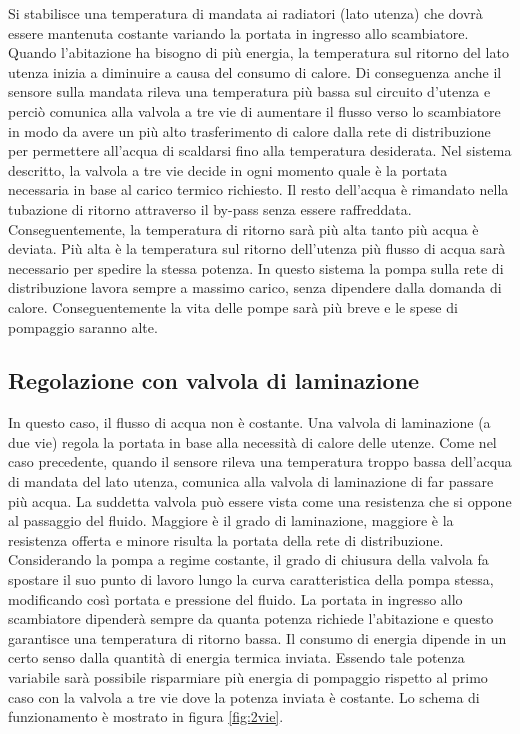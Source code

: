 \documentclass[laurea,oneside,11pt]{USiena_tesiLM}
\begin{document}
Si stabilisce una temperatura di mandata ai radiatori (lato utenza) che dovrà essere mantenuta costante variando la portata in ingresso allo scambiatore. Quando l'abitazione ha bisogno di più energia, la temperatura sul ritorno del lato utenza inizia a diminuire a causa del consumo di calore. Di conseguenza anche il sensore sulla mandata rileva una temperatura più bassa sul circuito d'utenza  e perciò comunica alla valvola a tre vie di aumentare il flusso verso lo scambiatore in modo da avere un più alto trasferimento di calore dalla rete di distribuzione per permettere all'acqua di scaldarsi fino alla temperatura desiderata.
Nel sistema descritto, la valvola a tre vie decide in ogni momento quale è la portata necessaria in base al carico termico richiesto. Il resto dell'acqua è rimandato nella tubazione di ritorno attraverso il by-pass senza essere raffreddata. Conseguentemente, la temperatura di ritorno sarà più alta tanto più acqua è deviata. Più alta è la temperatura sul ritorno dell'utenza     più flusso di acqua sarà necessario per spedire la stessa potenza. In questo sistema la pompa sulla rete di distribuzione lavora sempre a massimo carico, senza dipendere dalla domanda di calore. Conseguentemente la vita delle pompe sarà più breve e le spese di pompaggio saranno alte.

\subsection{Regolazione con valvola di laminazione}
\label{subsec:2vie}
In questo caso, il flusso di acqua non è costante. Una valvola di laminazione (a due vie) regola la portata in base alla necessità di calore delle utenze. 
Come nel caso precedente, quando il sensore rileva una temperatura troppo bassa dell'acqua di mandata del lato utenza, comunica alla valvola di laminazione di far passare più acqua. 
La suddetta valvola può essere vista come una resistenza che si oppone al passaggio del fluido. Maggiore è il grado di laminazione, maggiore è la resistenza offerta e minore risulta la portata della rete di distribuzione. Considerando la pompa a regime costante, il grado di chiusura della valvola fa spostare il suo punto di lavoro lungo la curva caratteristica della pompa stessa, modificando così portata e pressione del fluido.
La portata in ingresso allo scambiatore dipenderà sempre da quanta potenza richiede l'abitazione e questo garantisce una temperatura di ritorno bassa. 
Il consumo di energia dipende in un certo senso dalla quantità di energia termica inviata. Essendo tale potenza variabile sarà possibile risparmiare più energia di pompaggio rispetto al primo caso con la valvola a tre vie dove la potenza inviata è costante. Lo schema di funzionamento è mostrato in figura \ref{fig:2vie}.
\end{document}
